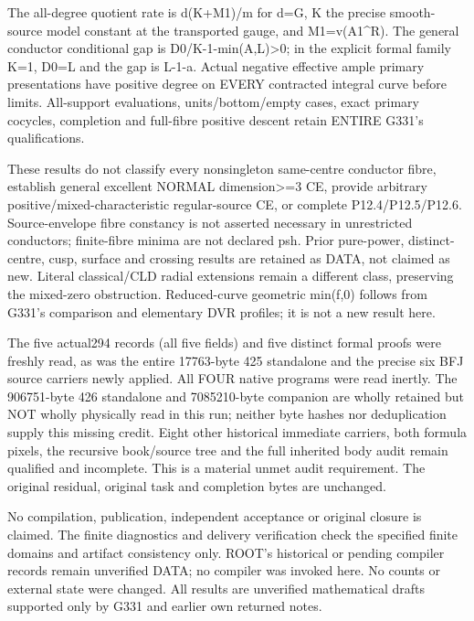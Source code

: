 \documentclass[11pt]{article}
\begin{document}
The all-degree quotient rate is d(K+M1)/m for d=\textbar{}G\textbar{}, K the precise smooth-source model constant at the transported gauge, and M1=\textbar{}\textbar{}v(A1\textasciicircum{}R)\textbar{}\textbar{}. The general conductor conditional gap is D0/K-1-min(A,L)>0; in the explicit formal family K=1, D0=L and the gap is L-1-a. Actual negative effective ample primary presentations have positive degree on EVERY contracted integral curve before limits. All-support evaluations, units/bottom/empty cases, exact primary cocycles, completion and full-fibre positive descent retain ENTIRE G331's qualifications.

These results do not classify every nonsingleton same-centre conductor fibre, establish general excellent NORMAL dimension>=3 CE, provide arbitrary positive/mixed-characteristic regular-source CE, or complete P12.4/P12.5/P12.6. Source-envelope fibre constancy is not asserted necessary in unrestricted conductors; finite-fibre minima are not declared psh. Prior pure-power, distinct-centre, cusp, surface and crossing results are retained as DATA, not claimed as new. Literal classical/CLD radial extensions remain a different class, preserving the mixed-zero obstruction. Reduced-curve geometric min(f,0) follows from G331's comparison and elementary DVR profiles; it is not a new result here.

The five actual294 records (all five fields) and five distinct formal proofs were freshly read, as was the entire 17763-byte 425 standalone and the precise six BFJ source carriers newly applied. All FOUR native programs were read inertly. The 906751-byte 426 standalone and 7085210-byte companion are wholly retained but NOT wholly physically read in this run; neither byte hashes nor deduplication supply this missing credit. Eight other historical immediate carriers, both formula pixels, the recursive book/source tree and the full inherited body audit remain qualified and incomplete. This is a material unmet audit requirement. The original residual, original task and completion bytes are unchanged.

No compilation, publication, independent acceptance or original closure is claimed. The finite diagnostics and delivery verification check the specified finite domains and artifact consistency only. ROOT's historical or pending compiler records remain unverified DATA; no compiler was invoked here. No counts or external state were changed. All results are unverified mathematical drafts supported only by G331 and earlier own returned notes.
\end{document}

